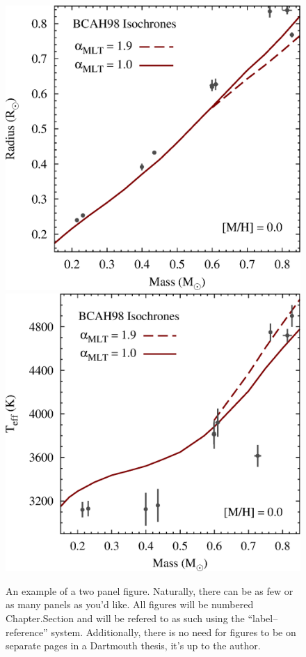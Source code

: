 \begin{figure}[t]
    \begin{center}
        \includegraphics[scale=0.42]{./ch1/fig/bcah_1_gyr_MR.eps}
        \hspace{\fill}
        \includegraphics[scale=0.42]{./ch1/fig/bcah_1_gyr_MT.eps}
        \caption[Example of a simple figure.]
        {An example of a two panel figure. Naturally, there can 
         be as few or as many panels as you'd like. All figures 
         will be numbered Chapter.Section and will be refered to
         as such using the ``label--reference'' system. Additionally,
         there is no need for figures to be on separate pages in
         a Dartmouth thesis, it's up to the author.}
        \label{fig:example1}
    \end{center}
\end{figure}
